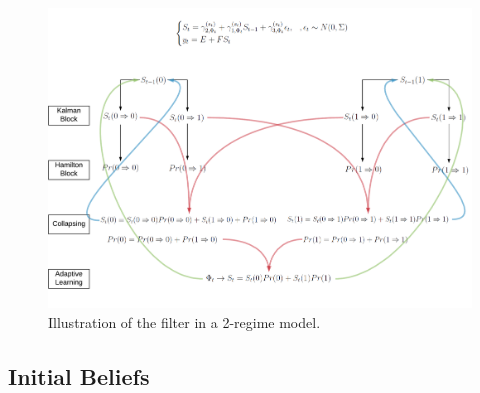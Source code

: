 \documentclass[12pt,reqno]{article}
\numberwithin{equation}{section}
\begin{document}
\begin{figure}[H]
\label{filter_km_illustration}
\caption{Illustration of the filter in a 2-regime model.} 
\includegraphics[scale=0.6]{zlb_filter.pdf}


\end{figure}


\subsection{Initial Beliefs}
\end{document}
